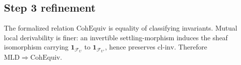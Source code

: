 \subsection{Step 3 refinement}

\begin{theorem}\label{thm:mld-refines-cohequiv}\leanok{}
The formalized relation \(\mathrm{CohEquiv}\) is equality of classifying
invariants.  Mutual local derivability is finer: an invertible
settling-morphism induces the sheaf isomorphism carrying
\(\mathbf{1}_{\mathcal{F}_U}\) to \(\mathbf{1}_{\mathcal{F}_{U'}}\), hence
preserves \(\mathrm{cl\text{-}inv}\).  Therefore
\(\mathrm{MLD}\Rightarrow\mathrm{CohEquiv}\).
\end{theorem}
